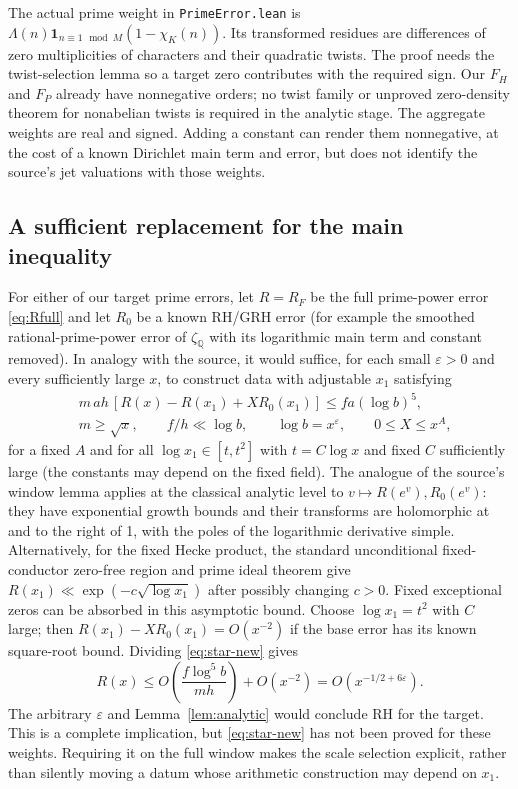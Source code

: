 \documentclass[11pt]{article}
\theoremstyle{remark}\newtheorem{remark}[theorem]{Remark}
\newcommand{\Q}{\mathbb Q}
\newcommand{\one}{\mathbf{1}}
\begin{document}
The actual prime weight in \texttt{PrimeError.lean} is $\Lambda(n)\one_{n\equiv1\,\bmod M}(1-\chi_K(n))$. Its transformed residues are differences of zero multiplicities of characters and their quadratic twists. The proof needs the twist-selection lemma so a target zero contributes with the required sign. Our $F_H$ and $F_P$ already have nonnegative orders; no twist family or unproved zero-density theorem for nonabelian twists is required in the analytic stage. The aggregate weights are real and signed. Adding a constant can render them nonnegative, at the cost of a known Dirichlet main term and error, but does not identify the source's jet valuations with those weights.

\subsection{A sufficient replacement for the main inequality}
For either of our target prime errors, let $R=R_F$ be the full prime-power error \eqref{eq:Rfull} and let $R_0$ be a known RH/GRH error (for example the smoothed rational-prime-power error of $\zeta_{\Q}$ with its logarithmic main term and constant removed). In analogy with the source, it would suffice, for each small $\varepsilon>0$ and every sufficiently large $x$, to construct data with adjustable $x_1$ satisfying
\begin{align}
 & m\,a h\,[R(x)-R(x_1)+X R_0(x_1)]\le fa(\log b)^5,\label{eq:star-new}\\
 &m\ge\sqrt x,\qquad f/h\ll\log b,\qquad \log b=x^\varepsilon,\qquad
 0\le X\le x^A,\nonumber
\end{align}
for a fixed $A$ and for all $\log x_1\in[t,t^2]$ with $t=C\log x$ and fixed $C$ sufficiently large (the constants may depend on the fixed field). The analogue of the source's window lemma applies at the classical analytic level to $v\mapsto R(e^v),R_0(e^v)$: they have exponential growth bounds and their transforms are holomorphic at and to the right of 1, with the poles of the logarithmic derivative simple. Alternatively, for the fixed Hecke product, the standard unconditional fixed-conductor zero-free region and prime ideal theorem give $R(x_1)\ll\exp(-c\sqrt{\log x_1})$ after possibly changing $c>0$. Fixed exceptional zeros can be absorbed in this asymptotic bound. Choose $\log x_1=t^2$ with $C$ large; then $R(x_1)-XR_0(x_1)=O(x^{-2})$ if the base error has its known square-root bound. Dividing \eqref{eq:star-new} gives
\[
 R(x)\le O\left(\frac{f\log^5 b}{mh}\right)+O(x^{-2})
      =O(x^{-1/2+6\varepsilon}).
\]
The arbitrary $\varepsilon$ and Lemma~\ref{lem:analytic} would conclude RH for the target. This is a complete implication, but \eqref{eq:star-new} has not been proved for these weights. Requiring it on the full window makes the scale selection explicit, rather than silently moving a datum whose arithmetic construction may depend on $x_1$.
\end{document}
